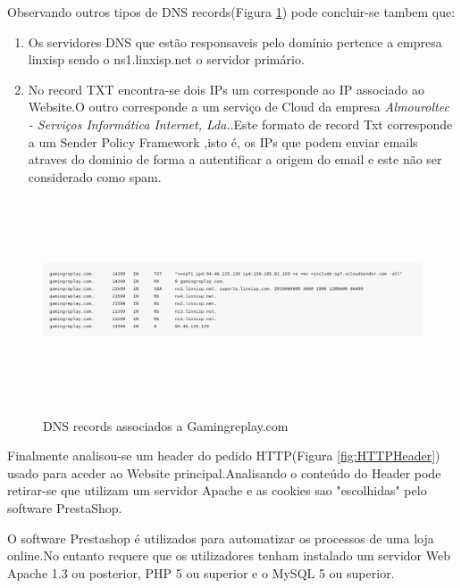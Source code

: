 Observando outros tipos de DNS records(Figura \ref{fig:DNSRecords}) pode concluir-se tambem que:

\begin{enumerate}

\item Os servidores DNS que estão responsaveis pelo domínio pertence a empresa linxisp sendo o ns1.linxisp.net o servidor primário.
\newline
\item No record TXT encontra-se dois IPs um corresponde ao IP associado ao Website.O outro corresponde a um serviço de Cloud da empresa \emph{Almouroltec - Serviços Informática Internet, Lda.}.Este formato de record Txt corresponde a um Sender Policy Framework ,isto é, os IPs que podem enviar emails atraves do dominio de forma a autentificar a origem do email e este não ser considerado como spam.

\end{enumerate}

\begin{figure}[h!]
\caption{DNS records associados a Gamingreplay.com}
\centering
\includegraphics[width=\textwidth,height=6cm,keepaspectratio]{Images/DNSRecords.png}
\label{fig:DNSRecords}
\end{figure}

Finalmente analisou-se um header do pedido HTTP(Figura \ref{fig:HTTPHeader}) usado para aceder ao Website principal.Analisando o conteúdo do Header pode retirar-se que utilizam um servidor Apache e as cookies sao "escolhidas" pelo software PrestaShop.

O software Prestashop é utilizados para automatizar os processos de uma loja online.No entanto requere que os utilizadores tenham instalado um servidor Web Apache 1.3 ou posterior, PHP 5 ou superior e o MySQL 5 ou superior.

